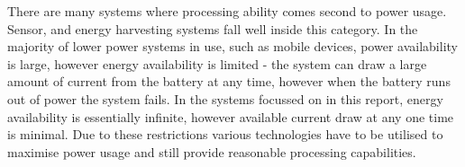 There are many systems where processing ability comes second to power usage.
Sensor, and energy harvesting systems fall well inside this category.
In the majority of lower power systems in use, such as mobile devices, power availability is large, however energy availability is limited - the system can draw a large amount of current from the battery at any time, however when the battery runs out of power the system fails.
In the systems focussed on in this report, energy availability is essentially infinite, however available current draw at any one time is minimal.
Due to these restrictions various technologies have to be utilised to maximise power usage and still provide reasonable processing capabilities.

